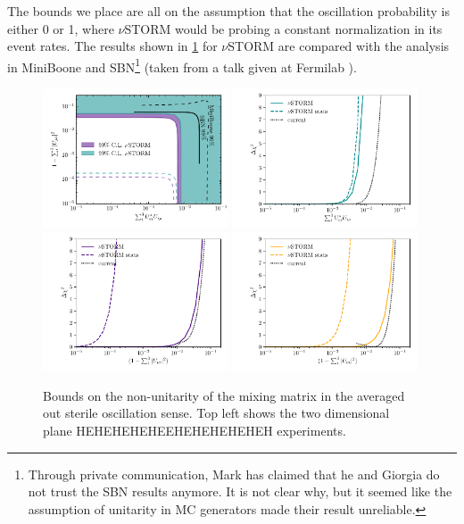 The bounds we place are all on the assumption that the oscillation probability is either 0 or 1, where $\nu$STORM would be probing a constant normalization in its event rates. The results shown in \ref{fig:non-uni} for $\nu$STORM are compared with the analysis in MiniBoone \cite{Karagiorgi2010} and SBN\footnote{Through private communication, Mark has claimed that he and Giorgia do not trust the SBN results anymore. It is not clear why, but it seemed like the assumption of unitarity in MC generators made their result unreliable.} (taken from a talk given at Fermilab \cite{Ross-Lonergan2016}).

\begin{figure}
\includegraphics[width=0.49\textwidth]{figs/Averaged_joined.pdf}
\includegraphics[width=0.49\textwidth]{figs/Averaged_1D_app.pdf}
\includegraphics[width=0.49\textwidth]{figs/Averaged_1D_dis.pdf}
\includegraphics[width=0.49\textwidth]{figs/Averaged_1D_edis.pdf}
\caption[Bounds and sensitivity of $\nu$STORM to averaged out sterile neutrinos.]{Bounds on the non-unitarity of the mixing matrix in the averaged out sterile oscillation sense. Top left shows the two dimensional plane HEHEHEHEHEEHEHEHEHEHEH experiments.\label{fig:non-uni}}
\end{figure}

